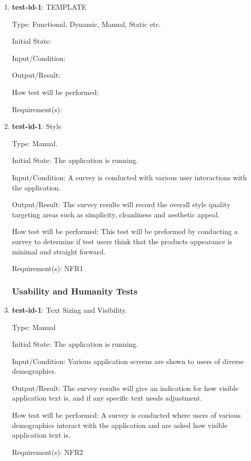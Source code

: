 \documentclass[12pt, titlepage]{article}
\begin{document}
	
	\begin{enumerate}
		
		\item{\textbf{test-id-1}}: TEMPLATE
		
		Type: Functional, Dynamic, Manual, Static etc.
		
		Initial State: 
		
		Input/Condition: 
		
		Output/Result: 
		
		How test will be performed: 
		
		Requirement(s):
			
		\item{\textbf{test-id-1}}: Style

		Type: Manual.
		
		Initial State: The application is running.
		
		Input/Condition: A survey is conducted with various user interactions with the application. 
		
		Output/Result: The survey results will record the overall style quality targeting areas such as simplicity, cleanliness and aesthetic appeal. 
		
		How test will be performed: This test will be preformed by conducting a survey to determine if test users think that the products appearance is minimal and straight forward.
		
		Requirement(s): NFR1
		
		

	
	\subsubsection{Usability and Humanity Tests}
		\item{\textbf{test-id-1}}: Text Sizing and Visibility.
		
		Type: Manual
		
		Initial State: The application is running.
		
		Input/Condition: Various application screens are shown to users of diverse demographics.
		
		Output/Result: The survey results will give an indication for how visible application text is, and if any specific text needs adjustment.
		
		How test will be performed: A survey is conducted where users of various demographics interact with the application and are asked how visible application text is.
		
		Requirement(s): NFR2
		

\end{enumerate}
\end{document}
